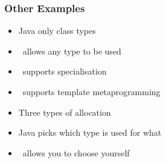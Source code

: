\begin{frame}
  \frametitle{Other Examples}
  \begin{itemize}
    \item Java only class types
    \item \cpp\ allows any type to be used
    \item \cpp\ supports specialisation
    \item \cpp\ supports template metaprogramming
  \end{itemize}
  \vskip5mm
  \begin{itemize}
    \item Three types of allocation
    \item Java picks which type is used for what
    \item \cpp\ allows you to choose yourself
  \end{itemize}
\end{frame}




